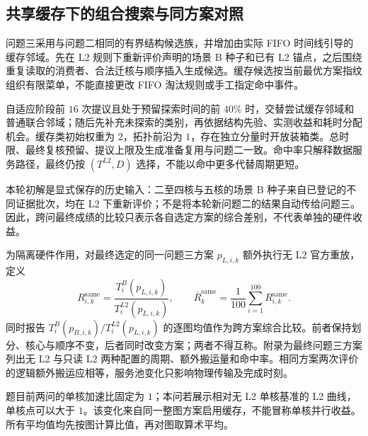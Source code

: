 \subsection{共享缓存下的组合搜索与同方案对照}
问题三采用与问题二相同的有界结构候选族，并增加由实际 FIFO 时间线引导的缓存邻域。先在 L2 规则下重新评价声明的场景 B 种子和已有 L2 锚点，之后围绕重复读取的消费者、合法迁核与顺序插入生成候选。缓存候选按当前最优方案指纹组织有限菜单，不能直接更改 FIFO 淘汰规则或手工指定命中事件。

自适应阶段前 $16$ 次提议且处于预留探索时间的前 $40\%$ 时，交替尝试缓存邻域和普通联合邻域；随后先补充未探索的类别，再依据结构先验、实测收益和耗时分配机会。缓存类初始权重为 $2$，拓扑前沿为 $1$，存在独立分量时开放装箱类。总时限、最终复核预留、提议上限及生成准备复用与问题二一致。命中率只解释数据服务路径，最终仍按 $(T^{L2},D)$ 选择，不能以命中更多代替周期更短。

本轮初解是显式保存的历史输入：二至四核与五核的场景 B 种子来自已登记的不同证据批次，均在 L2 下重新评价；不是将本轮新问题二的结果自动传给问题三。因此，跨问最终成绩的比较只表示各自选定方案的综合差别，不代表单独的硬件收益。

为隔离硬件作用，对最终选定的同一问题三方案 $p_{L,i,k}$ 额外执行无 L2 官方重放，定义
\begin{equation}
R^{\mathrm{same}}_{i,k}=\frac{T^B_i(p_{L,i,k})}{T^{L2}_i(p_{L,i,k})},\qquad
\overline R^{\mathrm{same}}_k=\frac1{100}\sum_{i=1}^{100}R^{\mathrm{same}}_{i,k}.
\end{equation}
同时报告 $T^B_i(p_{B,i,k})/T^{L2}_i(p_{L,i,k})$ 的逐图均值作为跨方案综合比较。前者保持划分、核心与顺序不变，后者同时改变方案；两者不得互称。附录为最终问题三方案列出无 L2 与只读 L2 两种配置的周期、额外搬运量和命中率。相同方案两次评价的逻辑额外搬运应相等，服务池变化只影响物理传输及完成时刻。

题目前两问的单核加速比固定为 $1$；本问若展示相对无 L2 单核基准的 L2 曲线，单核点可以大于 $1$。该变化来自同一整图方案启用缓存，不能冒称单核并行收益。所有平均值均先按图计算比值，再对图取算术平均。
